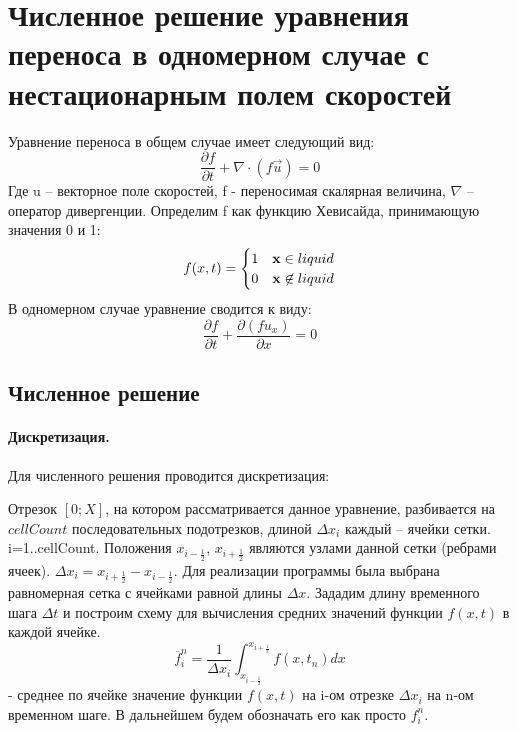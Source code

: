 \documentclass[12pt,a4paper]{article}
\begin{document}
\section{Численное решение уравнения переноса в одномерном случае с нестационарным полем скоростей}
Уравнение переноса в общем случае имеет следующий вид:
\begin{equation}
\frac{\partial f}{\partial t}+\nabla\cdot(f\overrightarrow{u})=0
\end{equation}
Где u – векторное поле скоростей, f - переносимая скалярная величина, $ \nabla $ – оператор дивергенции. Определим f как функцию Хевисайда, принимающую значения 0 и 1:
\begin{equation}
f(x,t)=\begin{cases}1 & {\bf x}\in liquid \\0 & {\bf x}\not\in liquid\end{cases}
\end{equation}
В одномерном случае уравнение сводится к виду:
\begin{equation}
\label{eqn:TE1D}
\frac{\partial f}{\partial t} + \frac{\partial (f u_{x})}{\partial x}=0
\end{equation}

\subsection{Численное решение}
\paragraph{Дискретизация.}
Для численного решения проводится дискретизация:

Отрезок $[0;X]$, на котором рассматривается данное уравнение, разбивается на $cellCount$ последовательных подотрезков, длиной $\Delta x_i$ каждый – ячейки сетки. i=1..cellCount. Положения $x_{i-\frac{1}{2}}$, $x_{i+\frac{1}{2}}$ являются узлами данной сетки (ребрами ячеек). $\Delta x_i=x_{i+\frac{1}{2}}-x_{i-\frac{1}{2}}$. Для реализации программы была выбрана равномерная сетка с ячейками равной длины $\Delta x$. Зададим длину временного шага $\Delta t$ и построим схему для вычисления средних значений функции $f(x,t)$ в каждой ячейке.
\begin{equation}
\overline{f}_i^n=\frac{1}{\Delta x_i}\int_{x_{i-\frac{1}{2}}}^{x_{i+\frac{1}{2}}}f(x,t_n)dx 
\end{equation}
- среднее по ячейке значение функции $f(x,t)$ на i-ом отрезке $\Delta x_i$ на n-ом временном шаге. В дальнейшем будем обозначать его как просто $f_i^n$.
\end{document}
